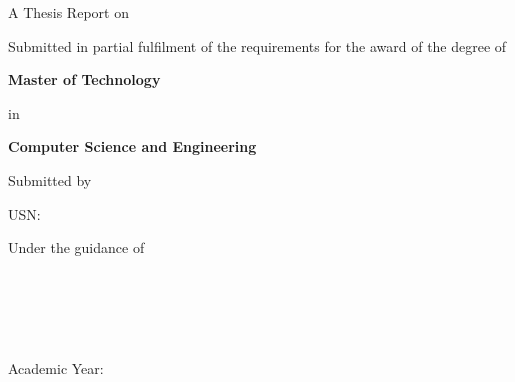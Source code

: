 \begin{titlepage}
\begin{center}
{\large \university\par}
\vspace{2mm}

\vspace{10mm}
{\normalsize A Thesis Report on\par}
\vspace{4mm}
{\Large\bfseries \thesistitle\par}

\vspace{10mm}
{\normalsize Submitted in partial fulfilment of the requirements for the award
of the degree of\par}
\vspace{3mm}
{\large\bfseries Master of Technology\par}
{\normalsize in\par}
{\large\bfseries Computer Science and Engineering\par}

\vspace{8mm}
{\normalsize Submitted by\par}
\vspace{2mm}
{\large\bfseries \candidatename\par}
{\normalsize USN: \candidateusn\par}

\vspace{8mm}
{\normalsize Under the guidance of\par}
\vspace{2mm}
{\large\bfseries \guidename\par}
{\normalsize \guidedesig\\ \deptname\par}

\vfill
{}
\vspace{4mm}

{\normalsize\bfseries \deptname\\
\collegename\\
\collegecity\par}
\vspace{3mm}
{\normalsize Academic Year: \academicyear\par}
\end{center}
\end{titlepage}
